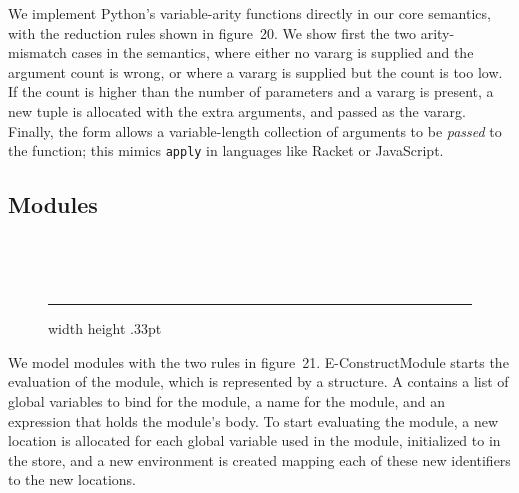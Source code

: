 \documentclass[10pt]{sigplanconf}
\newcommand{\Scribtexttt}[1]{{\texttt{#1}}}
\newcommand{\textsub}[1]{$_{\hbox{\textsmaller{#1}}}$}
\newcommand{\Larger}[1]{\textlarger{#1}}
\let\SOriginalthesubsubsection\thesubsubsection
\newcommand{\Ssubsection}[2]{\subsection[#1]{#2}\let\thesubsubsection\SOriginalthesubsubsection}
\newcommand{\Legend}[1]{~

                        \hrule width \hsize height .33pt
                        \vspace{4pt}
                        \legend{#1}}
\newcommand{\FigureTarget}[2]{#1}
\newcommand{\FigureRef}[2]{#1}
\newlength{\FigOrigskip}
\newenvironment{FigureMulti}{\begin{figure}[t!p]}{\end{figure}}
\newenvironment{Centerfigure}{\begin{Xfigure}\centering\item}{\end{Xfigure}}
\newenvironment{Xfigure}{\begin{list}{}{\leftmargin=0pt\topsep=0pt\parsep=\FigOrigskip\partopsep=0pt}}{\end{list}}
\newenvironment{FigureInside}{}{}
\newcommand{\Centertext}[1]{\begin{center}#1\end{center}}
\begin{document}
We implement Python{'}s variable{-}arity functions directly in our core semantics,
with the reduction rules shown in figure~\FigureRef{20}{t:x28counter_x28x22figurex22_x22fx3avarargsx22x29x29}.  We show first the
two arity{-}mismatch cases in the semantics, where either no vararg is supplied
and the argument count is wrong, or where a vararg is supplied but the
count is too low.  If the count is higher than the number of parameters and a
vararg is present, a new tuple is allocated with the extra arguments, and
passed as the vararg.  Finally, the form  allows a
variable{-}length collection of arguments to be \textit{passed} to the function;
this mimics \Scribtexttt{apply} in languages like Racket or JavaScript.

\Ssubsection{Modules}{Modules}\label{t:x28part_x22Modulesx22x29}

\begin{FigureMulti}\begin{Centerfigure}\begin{FigureInside}
\hspace*{\fill}\\
\end{FigureInside}\end{Centerfigure}

\Centertext{\Legend{\FigureTarget{\label{t:x28counter_x28x22figurex22_x22fx3amodulesx22x29x29}Figure~21: }{t:x28counter_x28x22figurex22_x22fx3amodulesx22x29x29}Simple modules in $\lambda$\textsub{\Larger{$\pi$}}}}\end{FigureMulti}

We model modules with the two rules in figure~\FigureRef{21}{t:x28counter_x28x22figurex22_x22fx3amodulesx22x29x29}.
E{-}ConstructModule starts the evaluation of the module, which is represented by
a  structure.  A  contains a list of
global variables to bind for the module, a name for the module, and an
expression that holds the module{'}s body.  To start evaluating the module, a new
location is allocated for each global variable used in the module, initialized
to  in the store, and a new environment is created
mapping each of these new identifiers to the new locations.
\end{document}
